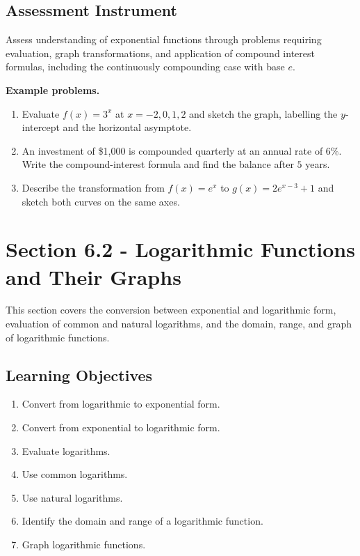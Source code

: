 \subsection{Assessment Instrument}
\label{ssec:asse-3669}

Assess understanding of exponential functions through problems requiring evaluation, graph
transformations, and application of compound interest formulas, including the continuously
compounding case with base $e$.

\textbf{Example problems.}
\begin{enumerate}
    \item Evaluate $f(x) = 3^{x}$ at $x = -2, 0, 1, 2$ and sketch the graph, labelling the $y$-intercept and the horizontal asymptote.
    \item An investment of \$1{,}000 is compounded quarterly at an annual rate of $6\%$. Write the compound-interest formula and find the balance after $5$ years.
    \item Describe the transformation from $f(x) = e^{x}$ to $g(x) = 2e^{x-3} + 1$ and sketch both curves on the same axes.
\end{enumerate}

\section{Section 6.2 - Logarithmic Functions and Their Graphs}
\label{sec:sect-84b2}

This section covers the conversion between exponential and logarithmic form, evaluation of
common and natural logarithms, and the domain, range, and graph of logarithmic functions.

\subsection{Learning Objectives}
\label{ssec:lear-fe6e}

\begin{enumerate}
    \item Convert from logarithmic to exponential form.
    \item Convert from exponential to logarithmic form.
    \item Evaluate logarithms.
    \item Use common logarithms.
    \item Use natural logarithms.
    \item Identify the domain and range of a logarithmic function.
    \item Graph logarithmic functions.
\end{enumerate}

